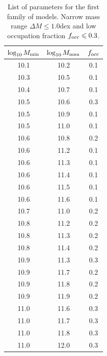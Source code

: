 \documentclass[usenatbib]{mn2e}
\begin{document}
\begin{table}
\begin{center}
\begin{tabular}{ccc}\hline\hline
$\log_{10}M_{\rm min}$ & $\log_{10}M_{\rm max}$ & $f_{\rm occ}$\\\hline
10.1& 10.2& 0.1\\
10.3& 10.5& 0.1\\
10.4& 10.7& 0.1\\
10.5& 10.6& 0.3\\
10.5& 10.9& 0.1\\
10.5& 11.0& 0.1\\
10.6& 10.8& 0.2\\
10.6& 11.2& 0.1\\
10.6& 11.3& 0.1\\
10.6& 11.4& 0.1\\
10.6& 11.5& 0.1\\
10.6& 11.6& 0.1\\
10.7& 11.0& 0.2\\
10.8& 11.2& 0.2\\
10.8& 11.3& 0.2\\
10.8& 11.4& 0.2\\
10.9& 11.3& 0.3\\
10.9& 11.7& 0.2\\
10.9& 11.8& 0.2\\
10.9& 11.9& 0.2\\
11.0& 11.6& 0.3\\
11.0& 11.7& 0.3\\
11.0& 11.8& 0.3\\
11.0& 12.0& 0.3\\\hline\hline
\end{tabular}
\end{center}
\caption{\label{table:firstfamily}List of parameters for the first
  family of models. Narrow   mass range $\Delta M\leq 1.0$dex and low
  occupation fraction $f_{\rm occ}\leq 0.3$.} 
\end{table}
\end{document}
